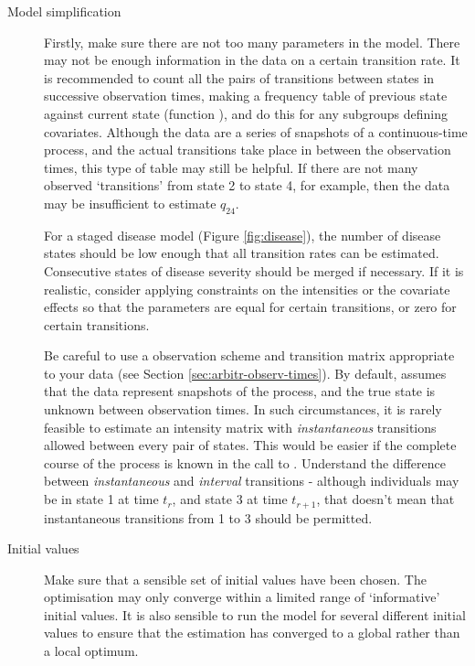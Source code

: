 \begin{description}

\item[Model simplification]

  Firstly, make sure there are not too many parameters in the model.  There may not be enough
  information in the data on a certain transition rate.  It is
  recommended to count all the pairs of transitions between states in
  successive observation times, making a frequency table of previous
  state against current state (function ),
  and do this for any subgroups defining covariates.
  Although the data are a series of snapshots of a continuous-time
  process, and the actual transitions take place in between the
  observation times, this type of table may still be helpful.  If
  there are not many observed `transitions' from state 2 to state 4,
  for example, then the data may be insufficient to estimate $q_{24}$.

  For a staged disease model (Figure \ref{fig:disease}), the number of
  disease states should be low enough that all transition rates can be
  estimated.  Consecutive states of disease severity should be merged
  if necessary.  If it is realistic, consider applying constraints on
  the intensities or the covariate effects so that the parameters are
  equal for certain transitions, or zero for certain transitions.

  Be careful to use a observation scheme and transition matrix
  appropriate to your data (see
  Section \ref{sec:arbitr-observ-times}). By default, 
  assumes that the data represent snapshots of the process, and the
  true state is unknown between observation times.  In such
  circumstances, it is rarely feasible to estimate an intensity matrix
  with \emph{instantaneous} transitions allowed between every pair of
  states.  This would be easier if the complete course of the process
  is known  in the call to
  .  Understand the difference between
  \emph{instantaneous} and \emph{interval} transitions - although
  individuals may be in state 1 at time $t_r$, and state 3 at time
  $t_{r+1}$, that doesn't mean that instantaneous transitions from 1
  to 3 should be permitted.


\item[Initial values] Make sure that a sensible set of initial values
  have been chosen. The optimisation may only converge within a
  limited range of `informative' initial values.  It is also sensible
  to run the model for several different initial values to ensure that
  the estimation has converged to a global rather than a local optimum.


\end{description}
